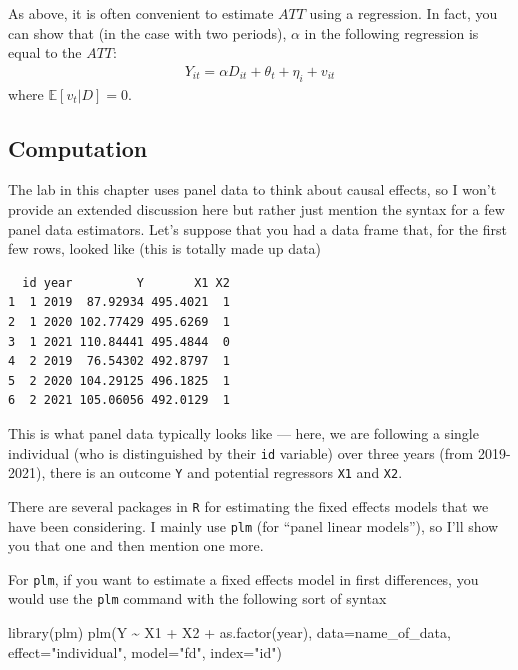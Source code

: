 \documentclass[
  letterpaper,
  DIV=11,
  numbers=noendperiod]{scrreprt}
\newenvironment{Shaded}{\begin{snugshade}}{\end{snugshade}}
\newcommand{\AttributeTok}[1]{\textcolor[rgb]{0.40,0.45,0.13}{#1}}
\newcommand{\FunctionTok}[1]{\textcolor[rgb]{0.28,0.35,0.67}{#1}}
\newcommand{\NormalTok}[1]{\textcolor[rgb]{0.00,0.23,0.31}{#1}}
\newcommand{\SpecialCharTok}[1]{\textcolor[rgb]{0.37,0.37,0.37}{#1}}
\newcommand{\StringTok}[1]{\textcolor[rgb]{0.13,0.47,0.30}{#1}}
\begin{document}
As above, it is often convenient to estimate \(ATT\) using a regression.
In fact, you can show that (in the case with two periods), \(\alpha\) in
the following regression is equal to the \(ATT\): \begin{align*}
  Y_{it} = \alpha D_{it} + \theta_t + \eta_i + v_{it}
\end{align*} where \(\mathbb{E}[v_t | D] = 0\).

\subsection{Computation}\label{computation-10}

The lab in this chapter uses panel data to think about causal effects,
so I won't provide an extended discussion here but rather just mention
the syntax for a few panel data estimators. Let's suppose that you had a
data frame that, for the first few rows, looked like (this is totally
made up data)

\begin{verbatim}
  id year         Y       X1 X2
1  1 2019  87.92934 495.4021  1
2  1 2020 102.77429 495.6269  1
3  1 2021 110.84441 495.4844  0
4  2 2019  76.54302 492.8797  1
5  2 2020 104.29125 496.1825  1
6  2 2021 105.06056 492.0129  1
\end{verbatim}

This is what panel data typically looks like --- here, we are following
a single individual (who is distinguished by their \texttt{id} variable)
over three years (from 2019-2021), there is an outcome \texttt{Y} and
potential regressors \texttt{X1} and \texttt{X2}.

There are several packages in \texttt{R} for estimating the fixed
effects models that we have been considering. I mainly use \texttt{plm}
(for ``panel linear models''), so I'll show you that one and then
mention one more.

For \texttt{plm}, if you want to estimate a fixed effects model in first
differences, you would use the \texttt{plm} command with the following
sort of syntax

\begin{Shaded}
\begin{Highlighting}[]
\FunctionTok{library}\NormalTok{(plm)}
\FunctionTok{plm}\NormalTok{(Y }\SpecialCharTok{\textasciitilde{}}\NormalTok{ X1 }\SpecialCharTok{+}\NormalTok{ X2 }\SpecialCharTok{+} \FunctionTok{as.factor}\NormalTok{(year), }
    \AttributeTok{data=}\NormalTok{name\_of\_data,}
    \AttributeTok{effect=}\StringTok{"individual"}\NormalTok{,}
    \AttributeTok{model=}\StringTok{"fd"}\NormalTok{,}
    \AttributeTok{index=}\StringTok{"id"}\NormalTok{)}
\end{Highlighting}
\end{Shaded}
\end{document}
